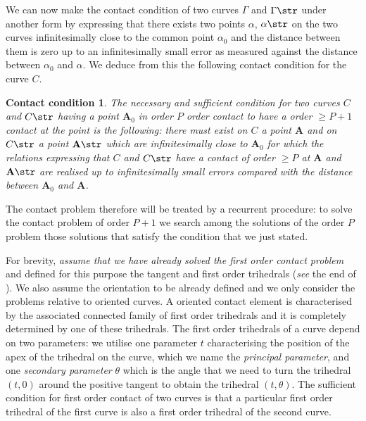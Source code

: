 We can now make the contact condition of two curves $\Gamma$ and $\Gamma\str$ under another form by expressing that there exists two points $\alpha$, $\alpha\str$ on the two curves infinitesimally close to the common point $\alpha_{0}$ and the distance between them is zero up to an infinitesimally small error as measured against the distance between $\alpha_{0}$ and $\alpha$. We deduce from this the following contact condition for the curve $C$.
\theoremstyle{shapesc}
\newtheorem*{contactcon}{Contact condition}
\begin{contactcon}
  The necessary and sufficient condition for two curves $C$ and $C\str$ having a point $\mathbf{A}_{0}$ in order $P$ order contact to have a order $\ge P+1$ contact at the point is the following: there must exist on $C$ a point $\mathbf{A}$ and on $C\str$ a point $\mathbf{A}\str$ which are infinitesimally close to $\mathbf{A}_{0}$ for which the relations expressing that $C$ and $C\str$ have a contact of order $\ge P$ at $\mathbf{A}$ and $\mathbf{A}\str$ are realised up to infinitesimally small errors compared with the distance between $\mathbf{A}_{0}$ and $\mathbf{A}$.
\end{contactcon}

The contact problem therefore will be treated by a recurrent procedure: to solve the contact problem of order $P+1$ we search among the solutions of the order $P$ problem those solutions that satisfy the condition that we just stated.

For brevity, \emph{assume that we have already solved the first order contact problem} and defined for this purpose the tangent and first order trihedrals (\emph{see} the end of ). We also assume the orientation to be already defined and we only consider the problems relative to oriented curves. A oriented contact element is characterised by the associated connected family of first order trihedrals and it is completely determined by one of these trihedrals. The first order trihedrals of a curve depend on two parameters: we utilise one parameter $t$ characterising the position of the apex of the trihedral on the curve, which we name the \emph{principal parameter}, and one \emph{secondary parameter} $\theta$ which is the angle that we need to turn the trihedral $(t,0)$ around the positive tangent to obtain the trihedral $(t,\theta)$. The sufficient condition for first order contact of two curves is that a particular first order trihedral of the first curve is also a first order trihedral of the second curve.

